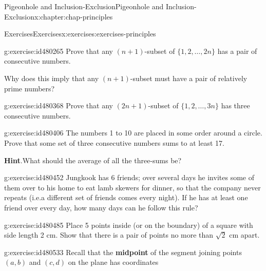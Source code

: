 \documentclass[oneside,10pt,]{book}
\newcommand{\blocktitlefont}{\relax}
\newcommand{\terminology}[1]{\textbf{#1}}
\numberwithin{equation}{section}
\begin{document}
\begin{chapterptx}{Pigeonhole and Inclusion-Exclusion}{}{Pigeonhole and Inclusion-Exclusion}{}{}{x:chapter:chap-principles}
\begin{exercises-section}{Exercises}{}{Exercises}{}{}{x:exercises:exercises-principles}
\begin{introduction}{}
\end{introduction}%
\begin{divisionexercise}{1}{}{}{g:exercise:id480265}%
Prove that any \((n+1)\)-subset of \(\{1,2,\ldots,2n\}\) has a pair of consecutive numbers.%
\par
Why does this imply that any \((n+1)\)-subset must have a pair of relatively prime numbers?%
\end{divisionexercise}%
\begin{divisionexercise}{2}{}{}{g:exercise:id480368}%
Prove that any \((2n+1)\)-subset of \(\{1,2,\ldots,3n\}\) has three consecutive numbers.%
\end{divisionexercise}%
\begin{divisionexercise}{3}{}{}{g:exercise:id480406}%
The numbers 1 to 10 are placed in some order around a circle. Prove that some set of three consecutive numbers sums to at least 17.%
\par\smallskip%
\noindent\textbf{\blocktitlefont Hint}.\hypertarget{g:hint:id480440}{}\quad{}What should the average of all the three-sums be?%
\end{divisionexercise}%
\begin{divisionexercise}{4}{}{}{g:exercise:id480452}%
Jungkook has 6 friends; over several days he invites some of them over to his home to eat lamb skewers for dinner, so that the company never repeats (i.e.\@ a different set of friends comes every night). If he has at least one friend over every day, how many days can he follow this rule?%
\par
%
\end{divisionexercise}%
\begin{divisionexercise}{5}{}{}{g:exercise:id480485}%
Place 5 points inside (or on the boundary) of a square with side length 2 cm. Show that there is a pair of points no more than \(\sqrt{2}\) cm apart.%
\begin{sidebyside}{1}{0.425}{0.425}{0}%
\begin{sbspanel}{0.15}%
%
\end{sbspanel}%
\end{sidebyside}%
\end{divisionexercise}%
\begin{divisionexercise}{6}{}{}{g:exercise:id480533}%
Recall that the \terminology{midpoint} of the segment joining points \((a,b)\) and \((c,d)\) on the plane has coordinates%

\end{divisionexercise}
\end{exercises-section}
\end{chapterptx}
\end{document}
